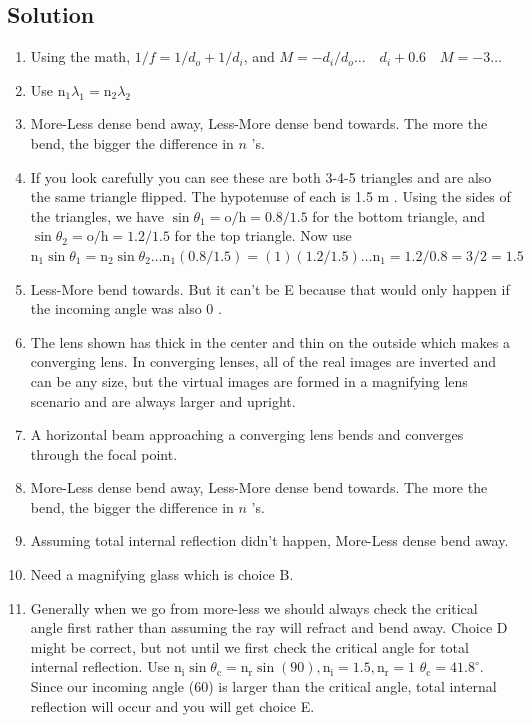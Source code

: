 \begin{enumerate}
\section*{Solution}
\begin{enumerate}
  \item Using the math, $1 / f=1 / d_{o}+1 / d_{i}$, and $M=-d_{i} / d_{o} \ldots \quad d_{i}+0.6 \quad M=-3 \ldots$
  \item Use $\mathrm{n}_{1} \lambda_{1}=\mathrm{n}_{2} \lambda_{2}$
  \item More-Less dense bend away, Less-More dense bend towards. The more the bend, the bigger the difference in $n$ 's.
  \item If you look carefully you can see these are both 3-4-5 triangles and are also the same triangle flipped. The hypotenuse of each is 1.5 m . Using the sides of the triangles, we have $\sin \theta_{1}=\mathrm{o} / \mathrm{h}=0.8 / 1.5$ for the bottom triangle, and $\sin \theta_{2}=\mathrm{o} / \mathrm{h}=1.2 / 1.5$ for the top triangle. Now use $\mathrm{n}_{1} \sin \theta_{1}=\mathrm{n}_{2} \sin \theta_{2} \ldots \mathrm{n}_{1}(0.8 / 1.5)=(1)(1.2 / 1.5) \ldots \mathrm{n}_{1}=1.2 / 0.8=3 / 2=1.5$
  \item Less-More bend towards. But it can't be E because that would only happen if the incoming angle was also 0 .
  \item The lens shown has thick in the center and thin on the outside which makes a converging lens. In converging lenses, all of the real images are inverted and can be any size, but the virtual images are formed in a magnifying lens scenario and are always larger and upright.
  \item A horizontal beam approaching a converging lens bends and converges through the focal point.
  \item More-Less dense bend away, Less-More dense bend towards. The more the bend, the bigger the difference in $n$ 's.
  \item Assuming total internal reflection didn't happen, More-Less dense bend away.
  \item Need a magnifying glass which is choice B.
  \item Generally when we go from more-less we should always check the critical angle first rather than assuming the ray will refract and bend away. Choice D might be correct, but not until we first check the critical angle for total internal reflection. Use $\mathrm{n}_{\mathrm{i}} \sin \theta_{\mathrm{c}}=\mathrm{n}_{\mathrm{r}} \sin (90), \mathrm{n}_{\mathrm{i}}=1.5, \mathrm{n}_{\mathrm{r}}=1$ $\theta_{\mathrm{c}}=41.8^{\circ}$. Since our incoming angle (60) is larger than the critical angle, total internal reflection will occur and you will get choice E.

\end{enumerate}
\end{enumerate}
